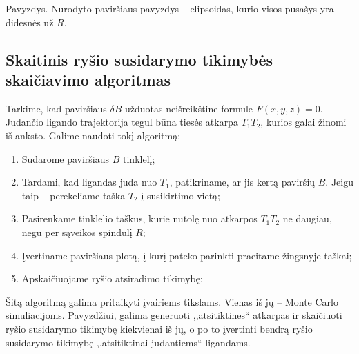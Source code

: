 \documentclass[10pt]{article}
\begin{document}
Pavyzdys. Nurodyto paviršiaus pavyzdys -- elipsoidas, kurio visos pusašys yra didesnės už $ R $.


 
\subsection{Skaitinis ryšio susidarymo tikimybės skaičiavimo algoritmas}
Tarkime, kad paviršiaus $ \delta B $ užduotas neišreikštine formule $ F(x,y,z) = 0 $. Judančio ligando trajektorija tegul būna tiesės atkarpa $ T_{1}T_{2} $, kurios galai žinomi iš anksto. Galime naudoti tokį  algoritmą:

\begin{enumerate}
\item Sudarome paviršiaus $ B $ tinklelį;
\item Tardami, kad ligandas juda nuo $ T_1 $, patikriname, ar jis kertą paviršių $ B $. Jeigu taip -- perekeliame taška $ T_2 $ į susikirtimo vietą;
\item Pasirenkame tinklelio taškus, kurie nutolę nuo atkarpos $ T_{1}T_{2} $ ne daugiau, negu per sąveikos spindulį $ R $;
\item Įvertiname paviršiaus plotą, į kurį pateko parinkti praeitame žingsnyje taškai;
\item Apskaičiuojame ryšio atsiradimo tikimybę;
   
\end{enumerate}

Šitą algoritmą galima pritaikyti įvairiems tikslams. Vienas iš jų -- Monte Carlo simuliacijoms. Pavyzdžiui, galima generuoti ,,atsitiktines`` atkarpas ir skaičiuoti ryšio susidarymo tikimybę kiekvienai iš jų, o po to įvertinti bendrą ryšio susidarymo tikimybę ,,atsitiktinai judantiems`` ligandams.
\end{document}
